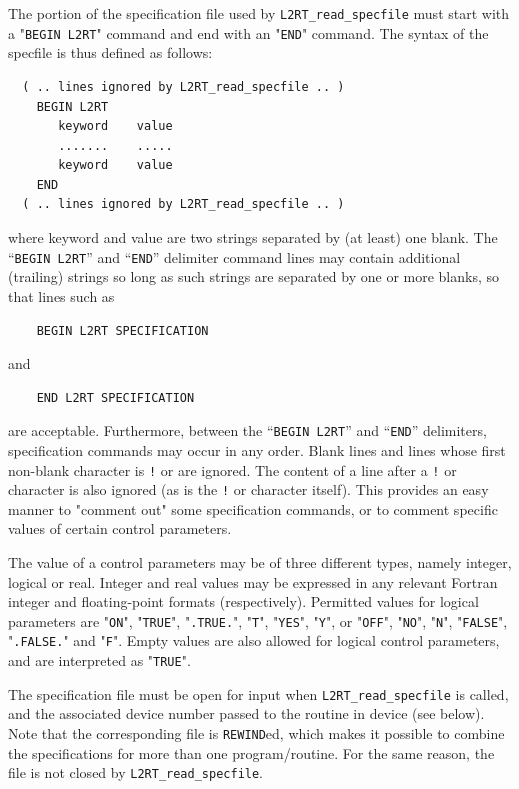 \documentclass{galahad}
\newcommand{\packagename}{L2\-RT}
\begin{document}
The portion of the specification file used by
{\tt \packagename\_read\_specfile}
must start
with a "{\tt BEGIN \packagename}" command and end with an
"{\tt END}" command.  The syntax of the specfile is thus defined as follows:
\begin{verbatim}
  ( .. lines ignored by L2RT_read_specfile .. )
    BEGIN L2RT
       keyword    value
       .......    .....
       keyword    value
    END
  ( .. lines ignored by L2RT_read_specfile .. )
\end{verbatim}
where keyword and value are two strings separated by (at least) one blank.
The ``{\tt BEGIN \packagename}'' and ``{\tt END}'' delimiter command lines
may contain additional (trailing) strings so long as such strings are
separated by one or more blanks, so that lines such as
\begin{verbatim}
    BEGIN L2RT SPECIFICATION
\end{verbatim}
and
\begin{verbatim}
    END L2RT SPECIFICATION
\end{verbatim}
are acceptable. Furthermore,
between the
``{\tt BEGIN \packagename}'' and ``{\tt END}'' delimiters,
specification commands may occur in any order.  Blank lines and
lines whose first non-blank character is {\tt !} or {\tt *} are ignored.
The content
of a line after a {\tt !} or {\tt *} character is also
ignored (as is the {\tt !} or {\tt *}
character itself). This provides an easy manner to "comment out" some
specification commands, or to comment specific values
of certain control parameters.

The value of a control parameters may be of three different types, namely
integer, logical or real.
Integer and real values may be expressed in any relevant Fortran integer and
floating-point formats (respectively). Permitted values for logical
parameters are "{\tt ON}", "{\tt TRUE}", "{\tt .TRUE.}", "{\tt T}",
"{\tt YES}", "{\tt Y}", or "{\tt OFF}", "{\tt NO}",
"{\tt N}", "{\tt FALSE}", "{\tt .FALSE.}" and "{\tt F}".
Empty values are also allowed for
logical control parameters, and are interpreted as "{\tt TRUE}".

The specification file must be open for
input when {\tt \packagename\_read\_specfile}
is called, and the associated device number
passed to the routine in device (see below).
Note that the corresponding
file is {\tt REWIND}ed, which makes it possible to combine the specifications
for more than one program/routine.  For the same reason, the file is not
closed by {\tt \packagename\_read\_specfile}.
\end{document}
